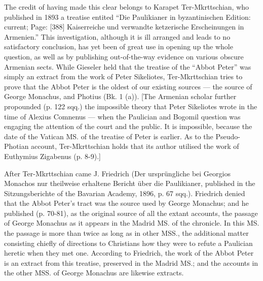 The credit of having made this clear belongs to Karapet Ter-Mkrttschian, who published in 1893 a treatise entited \texthebrew{“}Die Paulikianer in byzantinischen Edition: current; Page: [388] Kaiserreiche und verwandte ketzerische Erscheinungen in Armenien.\texthebrew{}” This investigation, although it is ill arranged and leads to no satisfactory conclusion, has yet been of great use in opening up the whole question, as well as by publishing out-of-the-way evidence on various obscure Armenian sects. While Gieseler held that the treatise of the \texthebrew{“}Abbot Peter\texthebrew{}” was simply an extract from the work of Peter Sikeliotes, Ter-Mkrttschian tries to prove that the Abbot Peter is the oldest of our existing sources \texthebrew{—} the source of George Monachus, and Photius (Bk. 1 (a)). [The Armenian scholar further propounded (p. 122 sqq.) the impossible theory that Peter Sikeliotes wrote in the time of Alexius Comnenus \texthebrew{—} when the Paulician and Bogomil question was engaging the attention of the court and the public. It is impossible, because the date of the Vatican MS. of the treatise of Peter is earlier. As to the Pseudo-Photian account, Ter-Mkrttschian holds that its author utilised the work of Euthymius Zigabenus (p. 8-9).]

After Ter-Mkrttschian came J. Friedrich (Der ursprüngliche bei Georgios Monachos nur theilweise erhaltene Bericht über die Paulikianer, published in the Sitzungsberichte of the Bavarian Academy, 1896, p. 67 sqq.). Friedrich denied that the Abbot Peter\texthebrew{}’s tract was the source used by George Monachus; and he published (p. 70-81), as the original source of all the extant accounts, the passage of George Monachus as it appears in the Madrid MS. of the chronicle. In this MS. the passage is more than twice as long as in other MSS., the additional matter consisting chiefly of directions to Christians how they were to refute a Paulician heretic when they met one. According to Friedrich, the work of the Abbot Peter is an extract from this treatise, preserved in the Madrid MS.; and the accounts in the other MSS. of George Monachus are likewise extracts.

